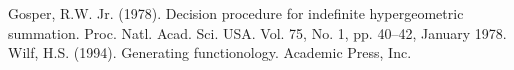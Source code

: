 Gosper, R.W. Jr. (1978). Decision procedure for indefinite hypergeometric summation. Proc. Natl. Acad. Sci. USA. Vol. 75, No. 1, pp. 40--42, January 1978.\label{Ref: gosper}
Wilf, H.S. (1994). Generating functionology. Academic Press, Inc.\label{Ref: wilf}
